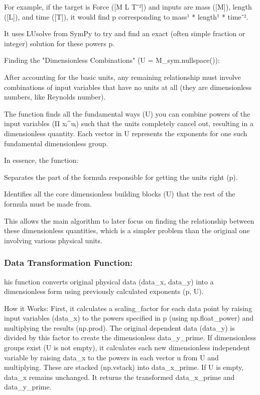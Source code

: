 \documentclass{article}
\begin{document}
        For example, if the target is Force ([M L T⁻²]) and inputs are mass ([M]), length ([L]), and time ([T]), it would find p corresponding to mass¹ * length¹ * time⁻².

        It uses LUsolve from SymPy to try and find an exact (often simple fraction or integer) solution for these powers p.

    Finding the "Dimensionless Combinations" (U = M_sym.nullspace()):

        After accounting for the basic units, any remaining relationship must involve combinations of input variables that have no units at all (they are dimensionless numbers, like Reynolds number).

        The function finds all the fundamental ways (U) you can combine powers of the input variables (Π xᵢ^uᵢ) such that the units completely cancel out, resulting in a dimensionless quantity. Each vector in U represents the exponents for one such fundamental dimensionless group.

In essence, the function:

    Separates the part of the formula responsible for getting the units right (p).

    Identifies all the core dimensionless building blocks (U) that the rest of the formula must be made from.

This allows the main algorithm to later focus on finding the relationship between these dimensionless quantities, which is a simpler problem than the original one involving various physical units.\\

\subsubsection{Data Transformation Function:}

his function converts original physical data (data_x, data_y) into a dimensionless form using previously calculated exponents (p, U).

How it Works: First, it calculates a scaling_factor for each data point by raising input variables (data_x) to the powers specified in p (using np.float_power) and multiplying the results (np.prod). The original dependent data (data_y) is divided by this factor to create the dimensionless data_y_prime. If dimensionless groups exist (U is not empty), it calculates each new dimensionless independent variable by raising data_x to the powers in each vector u from U and multiplying. These are stacked (np.vstack) into data_x_prime. If U is empty, data_x remains unchanged. It returns the transformed data_x_prime and data_y_prime.\\
\end{document}
